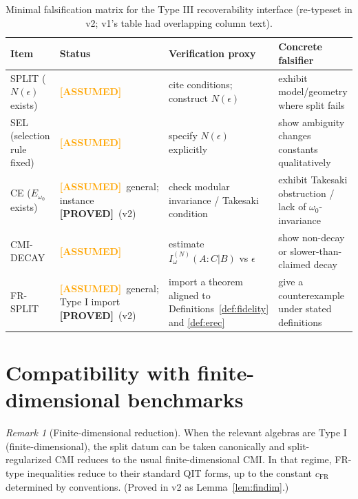 \documentclass[11pt]{article}
\theoremstyle{definition}
\theoremstyle{remark}
\newtheorem{remark}[theorem]{Remark}
\newcommand{\ASSUMED}{\textcolor{orange}{\textbf{[ASSUMED]}}}
\newcommand{\PROVED}{\textcolor{green!60!black}{\textbf{[PROVED]}}}
\begin{document}
\begin{table}[h!]
\centering
\begin{tabular}{p{3.0cm} p{2.2cm} p{4.2cm} p{4.6cm}}
\hline
\textbf{Item} & \textbf{Status} & \textbf{Verification proxy} &
\textbf{Concrete falsifier} \\
\hline
SPLIT ($N(\epsilon)$ exists) & \ASSUMED & cite conditions; construct
$N(\epsilon)$ & exhibit model/geometry where split fails \\
SEL (selection rule fixed) & \ASSUMED & specify $N(\epsilon)$ explicitly
& show ambiguity changes constants qualitatively \\
CE ($E_{\omega_0}$ exists) & \ASSUMED\ general; instance \PROVED\ (v2) &
check modular invariance / Takesaki condition & exhibit Takesaki
obstruction / lack of $\omega_0$-invariance \\
CMI-DECAY & \ASSUMED & estimate $I^{(N)}_\omega(A:C|B)$ vs $\epsilon$ &
show non-decay or slower-than-claimed decay \\
FR-SPLIT & \ASSUMED\ general; Type I import \PROVED\ (v2) & import a
theorem aligned to Definitions~\ref{def:fidelity} and \ref{def:erec} &
give a counterexample under stated definitions \\
\hline
\end{tabular}
\caption{Minimal falsification matrix for the Type III recoverability
interface (re-typeset in v2; v1's table had overlapping column text).}
\label{tab:fals}
\end{table}

\section{Compatibility with finite-dimensional benchmarks}

\begin{remark}[Finite-dimensional reduction]
\label{rem:findim}
When the relevant algebras are Type I (finite-dimensional), the split
datum can be taken canonically and split-regularized CMI reduces to the
usual finite-dimensional CMI. In that regime, FR-type inequalities
reduce to their standard QIT forms, up to the constant $c_{\mathrm{FR}}$
determined by conventions. (Proved in v2 as Lemma~\ref{lem:findim}.)
\end{remark}
\end{document}
